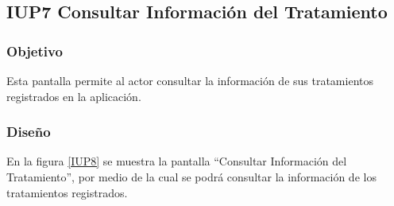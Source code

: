 \subsection{IUP7 Consultar Información del Tratamiento}
 
\subsubsection{Objetivo}

    Esta pantalla permite al actor consultar la información de sus tratamientos registrados en la aplicación.

\subsubsection{Diseño}

    En la figura \ref{IUP8} se muestra la pantalla ``Consultar Información del Tratamiento'', por medio de la cual se podrá consultar la información de los tratamientos registrados. \\
\newpage

%
%

